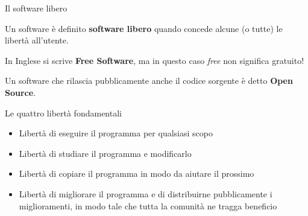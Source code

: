 \documentclass[10pt]{beamer}
\begin{document}
\begin{frame}[fragile]{Il software libero}

Un software è definito \textbf{software libero} quando concede alcune (o tutte) le libertà all'utente.

In Inglese si scrive \textbf{Free Software}, ma in questo caso \textit{free} non significa gratuito!

Un software che rilascia pubblicamente anche il codice sorgente è detto \textbf{Open Source}.

\end{frame}

\begin{frame}[fragile]{Le quattro libertà fondamentali}

\begin{itemize}
\item Libertà di eseguire il programma per qualsiasi scopo
\item \pause Libertà di studiare il programma e modificarlo
\item \pause Libertà di copiare il programma in modo da aiutare il prossimo
\item \pause Libertà di migliorare il programma e di distribuirne pubblicamente i miglioramenti, in modo tale che tutta la comunità ne tragga beneficio
\end{itemize}

\end{frame}
\end{document}
